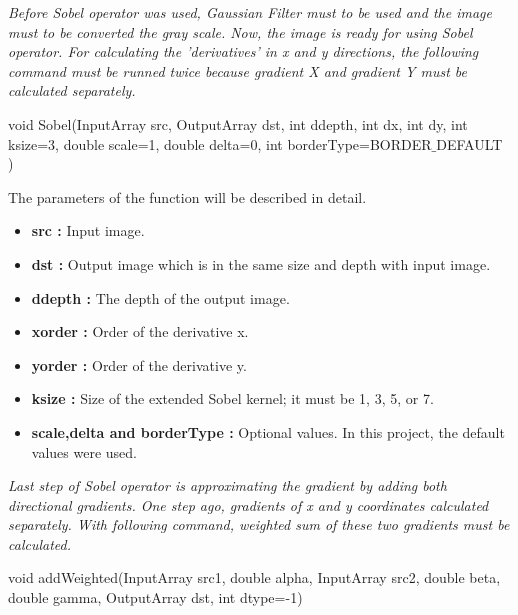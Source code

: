 \emph{\color{blue}Before Sobel operator was used, Gaussian Filter must to be used and the image must to be converted the gray scale. Now, the image is ready for using Sobel operator. For calculating the 'derivatives' in x and y directions, the following command must be runned twice because gradient X and gradient Y must be calculated separately.}

 \begin{center}

void Sobel(InputArray src, OutputArray dst, int ddepth, int dx, int dy, int ksize=3, double scale=1, double delta=0, int borderType=BORDER$\_$DEFAULT )

 \end{center}
 
 The parameters of the function will be described in detail.
 
  \begin{itemize}

\item \textbf{src : }Input image.

\item \textbf{dst : }Output image which is in the same size and depth with input image.

\item \textbf{ddepth : }The depth of the output image.

\item \textbf{xorder : }Order of the derivative x.

\item \textbf{yorder : }Order of the derivative y.

\item \textbf{ksize : }Size of the extended Sobel kernel; it must be 1, 3, 5, or 7.

\item \textbf{scale,delta and borderType : }Optional values. In this project, the default values were used.

  \end{itemize}

\emph{\color{blue}Last step of Sobel operator is approximating the gradient by adding both directional gradients. One step ago, gradients of x and y coordinates calculated separately. With following command, weighted sum of these two gradients must be calculated.\cite{addWeighted}}

 \begin{center}
 
void addWeighted(InputArray src1, double alpha, InputArray src2, double beta, double gamma, OutputArray dst, int dtype=-1)
 
  \end{center}
  
